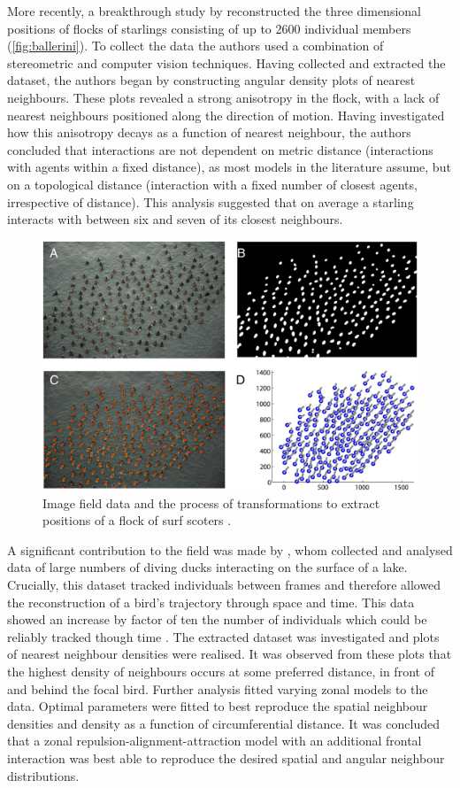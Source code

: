More recently, a breakthrough study by \citet{ballerini08} reconstructed the three dimensional positions of flocks of starlings consisting of up to 2600 individual members (\cref{fig:ballerini}). To collect the data the authors used a combination of stereometric and computer vision techniques. Having collected and extracted the dataset, the authors began by constructing angular density plots of nearest neighbours. These plots revealed a strong anisotropy in the flock, with a lack of nearest neighbours positioned along the direction of motion. Having investigated how this anisotropy decays as a function of nearest neighbour, the authors concluded that interactions are not dependent on metric distance (interactions with agents within a fixed distance), as most models in the literature assume, but on a topological distance (interaction with a fixed number of closest agents, irrespective of distance). This analysis suggested that on average a starling interacts with between six and seven of its closest neighbours.

\begin{figure}[t]
	\includegraphics[width=\textwidth]{lukeman_data.jpg}
	\caption{Image field data and the process of transformations to extract positions of a flock of surf scoters \citep{lukeman10}.}
	\label{fig:lukeman_extraction}
\end{figure}

A significant contribution to the field was made by \citet{lukeman10}, whom collected and analysed data of large numbers of diving ducks interacting on the surface of a lake. Crucially, this dataset tracked individuals between frames and therefore allowed the reconstruction of a bird's trajectory through space and time. This data showed an increase by factor of ten the number of individuals which could be reliably tracked though time \citep{lukeman09}. The extracted dataset was investigated and plots of nearest neighbour densities were realised. It was observed from these plots that the highest density of neighbours occurs at some preferred distance, in front of and behind the focal bird. Further analysis fitted varying zonal models to the data. Optimal parameters were fitted to best reproduce the spatial neighbour densities and density as a function of circumferential distance. It was concluded that a zonal repulsion-alignment-attraction model with an additional frontal interaction was best able to reproduce the desired spatial and angular neighbour distributions.

